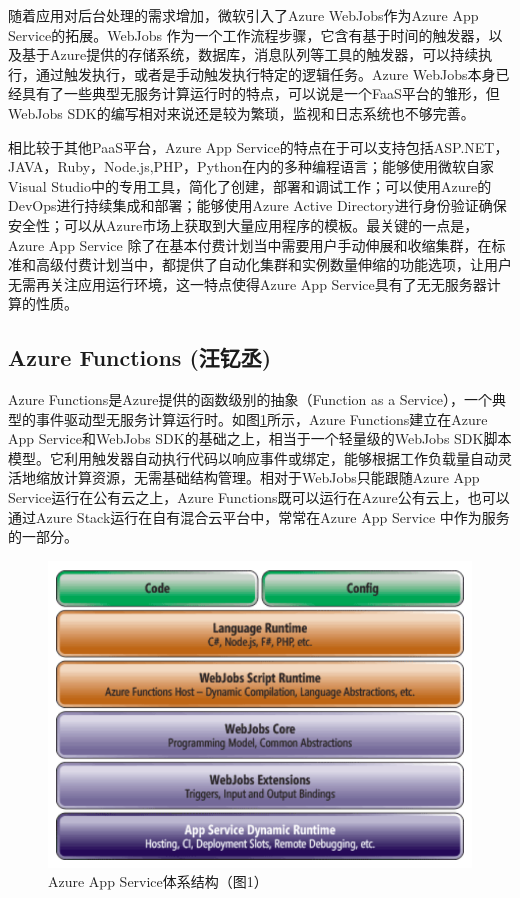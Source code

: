 \documentclass[11pt]{article}
\begin{document}
随着应用对后台处理的需求增加，微软引入了Azure WebJobs作为Azure App Service的拓展。WebJobs 作为一个工作流程步骤，它含有基于时间的触发器，以及基于Azure提供的存储系统，数据库，消息队列等工具的触发器，可以持续执行，通过触发执行，或者是手动触发执行特定的逻辑任务。Azure WebJobs本身已经具有了一些典型无服务计算运行时的特点，可以说是一个FaaS平台的雏形，但WebJobs SDK的编写相对来说还是较为繁琐，监视和日志系统也不够完善。

相比较于其他PaaS平台，Azure App Service的特点在于可以支持包括ASP.NET，JAVA，Ruby，Node.js,PHP，Python在内的多种编程语言；能够使用微软自家Visual Studio中的专用工具，简化了创建，部署和调试工作；可以使用Azure的DevOps进行持续集成和部署；能够使用Azure Active Directory进行身份验证确保安全性；可以从Azure市场上获取到大量应用程序的模板。最关键的一点是，Azure App Service 除了在基本付费计划当中需要用户手动伸展和收缩集群，在标准和高级付费计划当中，都提供了自动化集群和实例数量伸缩的功能选项，让用户无需再关注应用运行环境，这一特点使得Azure App Service具有了无无服务器计算的性质。


\subsection{Azure Functions (汪钇丞)}
Azure Functions是Azure提供的函数级别的抽象（Function as a Service），一个典型的事件驱动型无服务计算运行时。如图\ref{figs:architecture}所示，Azure Functions建立在Azure App Service和WebJobs SDK的基础之上，相当于一个轻量级的WebJobs SDK脚本模型。它利用触发器自动执行代码以响应事件或绑定，能够根据工作负载量自动灵活地缩放计算资源，无需基础结构管理。相对于WebJobs只能跟随Azure App Service运行在公有云之上，Azure Functions既可以运行在Azure公有云上，也可以通过Azure Stack运行在自有混合云平台中，常常在Azure App Service 中作为服务的一部分。

\begin{figure}[!htbp]
	\centering
	\includegraphics[scale=0.5]{figs/AzureArchitecture.PNG}
	\caption{Azure App Service体系结构（\cite{archi}图1）}
	\label{figs:architecture}
\end{figure}
\end{document}
